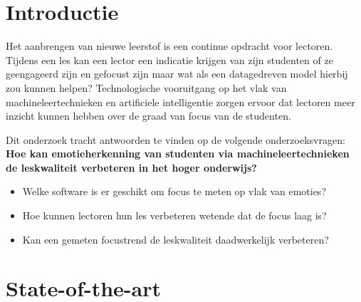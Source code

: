 
\section{Introductie} %
\label{sec:introductie}


Het aanbrengen van nieuwe leerstof is een continue opdracht voor lectoren. Tijdens een les kan een lector een indicatie krijgen van zijn studenten of ze geengageerd zijn en gefocust zijn maar wat als een datagedreven model hierbij zou kunnen helpen? Technologische vooruitgang op het vlak van machineleertechnieken en artificiele intelligentie zorgen ervoor dat lectoren meer inzicht kunnen hebben over de graad van focus van de studenten.

Dit onderzoek tracht antwoorden te vinden op de volgende onderzoeksvragen: 
\textbf{Hoe kan emotieherkenning van studenten via machineleertechnieken de leskwaliteit verbeteren in het hoger onderwijs?}
\begin{itemize}
    \item Welke software is er geschikt om focus te meten op vlak van emoties?
    \item Hoe kunnen lectoren hun les verbeteren wetende dat de focus laag is?
    \item Kan een gemeten focustrend de leskwaliteit daadwerkelijk verbeteren?
\end{itemize}


\section{State-of-the-art}
\label{sec:state-of-the-art}


